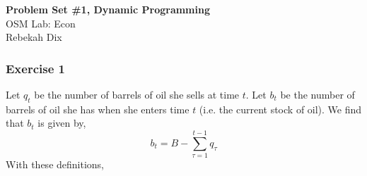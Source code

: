 \documentclass[letterpaper,12pt]{article}
\theoremstyle{definition}
\begin{document}
\begin{flushleft}
  \textbf{\large{Problem Set \#1, Dynamic Programming}} \\
  OSM Lab: Econ \\
  Rebekah Dix
\end{flushleft}

\vspace{5mm}

\subsubsection*{Exercise 1}
Let $q_t$ be the number of barrels of oil she sells at time $t$. Let $b_t$ be the number of barrels of oil she has when she enters time $t$ (i.e. the current stock of oil). We find that $b_t$ is given by,
\begin{equation}
  b_t = B - \sum_{\tau = 1}^{t-1} q_{\tau}
\end{equation}
With these definitions,
\end{document}
